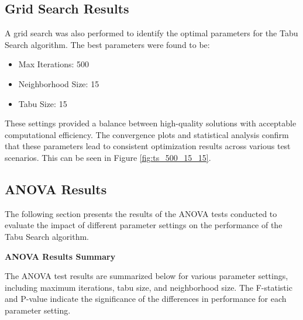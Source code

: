 \documentclass{article}
\begin{document}
    \subsection{Grid Search Results}
    A grid search was also performed to identify the optimal parameters for the Tabu Search algorithm. The best parameters were found to be:
    \begin{itemize}
        \item Max Iterations: 500
        \item Neighborhood Size: 15
        \item Tabu Size: 15
    \end{itemize}
    These settings provided a balance between high-quality solutions with acceptable computational efficiency. The convergence plots and statistical analysis confirm that these parameters lead to consistent optimization results across various test scenarios. This can be seen in Figure \ref{fig:ts_500_15_15}.

    \subsection{ANOVA Results}

    The following section presents the results of the ANOVA tests conducted to evaluate the impact of different parameter settings on the performance of the Tabu Search algorithm.

    \textbf{ANOVA Results Summary}

    The ANOVA test results are summarized below for various parameter settings, including maximum iterations, tabu size, and neighborhood size. The F-statistic and P-value indicate the significance of the differences in performance for each parameter setting.
\end{document}
